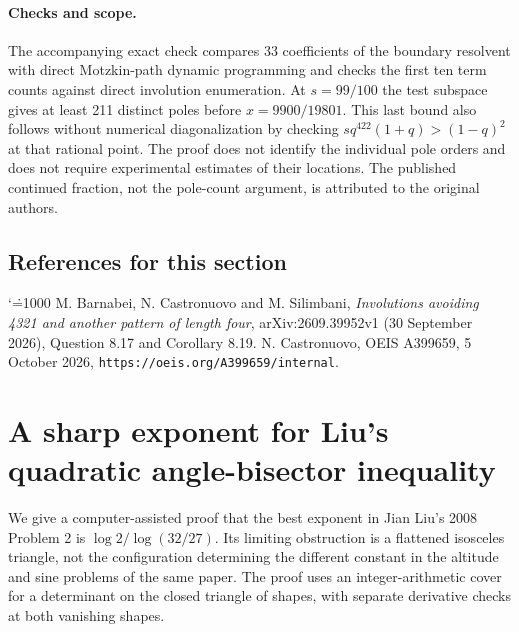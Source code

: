 \documentclass[11pt,a4paper]{article}
\makeatletter
\numberwithin{equation}{section}
\theoremstyle{definition}
\theoremstyle{remark}
\newenvironment{sectionabstract}{\par\smallskip\begingroup\small\noindent}{\par\endgroup\medskip}
\renewenvironment{thebibliography}[1]
 {\subsection*{References for this section}\small
  \list{\@biblabel{\@arabic\c@enumiv}}
       {\settowidth\labelwidth{\@biblabel{#1}}\leftmargin\labelwidth
        \advance\leftmargin\labelsep\@openbib@code
        \usecounter{enumiv}\let\p@enumiv\@empty
        \renewcommand\theenumiv{\@arabic\c@enumiv}}
  \sloppy\clubpenalty4000\widowpenalty4000\sfcode`\.=1000\relax}
 {\def\@noitemerr{\@latex@warning{Empty bibliography}}\endlist}
\makeatother
\begin{document}
\paragraph{Checks and scope.}
The accompanying exact check compares 33 coefficients of the boundary
resolvent with direct Motzkin-path dynamic programming and checks
the first ten term counts against direct involution enumeration. At
$s=99/100$ the test subspace gives at least 211 distinct poles before
$x=9900/19801$. This last bound also follows without numerical
diagonalization by checking
$sq^{422}(1+q)>(1-q)^2$ at that rational point.
The proof does not identify the individual pole orders and does not
require experimental estimates of their locations. The published
continued fraction, not the pole-count argument, is attributed to
the original authors.

\begin{thebibliography}{9}
 M. Barnabei, N. Castronuovo and M. Silimbani,
\emph{Involutions avoiding 4321 and another pattern of length four},
arXiv:2609.39952v1 (30 September 2026), Question 8.17 and
Corollary 8.19.
 N. Castronuovo, OEIS A399659, 5 October 2026,
\texttt{https://oeis.org/A399659/internal}.
\end{thebibliography}

\par\endgroup

\begingroup

\section{\texorpdfstring{A sharp exponent for Liu's quadratic angle-bisector inequality}{A sharp exponent for Liu's quadratic angle-bisector inequality}}\label{section:r41showa}
\par\medskip


\begin{sectionabstract}
We give a computer-assisted proof that the best exponent in Jian Liu's 2008 Problem 2 is $\log 2/\log(32/27)$. Its limiting obstruction is a flattened isosceles triangle, not the configuration determining the different constant in the altitude and sine problems of the same paper. The proof uses an integer-arithmetic cover for a determinant on the closed triangle of shapes, with separate derivative checks at both vanishing shapes.
\end{sectionabstract}
\end{document}
